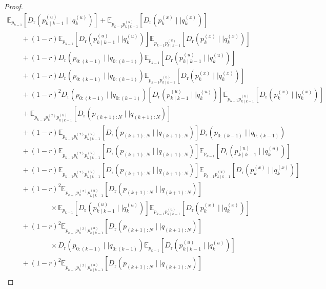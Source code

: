 \documentclass[10pt,a4paper]{amsart}
\newcommand{\Dr}[2]{{D}_{\text{r}}\left(#1\mid \mid #2 \right)}
\newcommand{\E}{\mathbb{E}}
\newcommand{\shortplant}[1]{p_{{#1}}^{(x)}}
\newcommand{\shortpolicy}[2]{p_{{#1}\mid{#2}}^{(u)}}
\begin{document}
\begin{proof}
\begin{equation}\label{eq:generalexpandk}
\begin{array}{l}
\E_{p_{k-1}}\left[\Dr{\shortpolicy{k}{k-1}}{q^{(u)}_k}\right] + \E_{p_{k-1}\shortpolicy{k}{k-1}}\left[\Dr{\shortplant{k}}{q^{(x)}_k}\right] \\ 
\qquad 
 + (1-r) \E_{p_{k-1}}\left[\Dr{\shortpolicy{k}{k-1}}{q^{(u)}_k}\right]\E_{p_{k-1}\shortpolicy{k}{k-1}}\left[\Dr{\shortplant{k}}{q^{(x)}_k}\right]
\\ 
\qquad
+ (1-r) \Dr{p_{0:(k-1)}}{q_{0:(k-1)}}\E_{p_{k-1}}\left[\Dr{\shortpolicy{k}{k-1}}{q^{(u)}_k}\right]
\\ 
\qquad
+ (1-r) \Dr{p_{0:(k-1)}}{q_{0:(k-1)}}\E_{p_{k-1}\shortpolicy{k}{k-1}}\left[\Dr{\shortplant{k}}{q^{(x)}_k}\right]
\\ 
\qquad
+ (1-r)^2 \Dr{p_{0:(k-1)}}{q_{0:(k-1)}}\left[\Dr{\shortpolicy{k}{k-1}}{q^{(u)}_k}\right]\E_{p_{k-1}\shortpolicy{k}{k-1}}\left[\Dr{\shortplant{k}}{q^{(x)}_k}\right]
\\ \qquad + \E_{p_{k-1}\shortplant{k}\shortpolicy{k}{k-1}}\left[\Dr{p_{(k+1):N}}{q_{(k+1):N}}\right] \\ 
\qquad + (1-r)  \E_{p_{k-1}\shortplant{k}\shortpolicy{k}{k-1}}\left[\Dr{p_{(k+1):N}}{q_{(k+1):N}}\right]  \Dr{p_{0:(k-1)}}{q_{0:(k-1)}}\\ 
\qquad + (1-r)  \E_{p_{k-1}\shortplant{k}\shortpolicy{k}{k-1}}\left[\Dr{p_{(k+1):N}}{q_{(k+1):N}}\right]
\E_{p_{k-1}}\left[\Dr{\shortpolicy{k}{k-1}}{q^{(u)}_k}\right]\\ 
\qquad + (1-r)  \E_{p_{k-1}\shortplant{k}\shortpolicy{k}{k-1}}\left[\Dr{p_{(k+1):N}}{q_{(k+1):N}}\right]
\E_{p_{k-1}\shortpolicy{k}{k-1}}\left[\Dr{\shortplant{k}}{q^{(x)}_k}\right] \\ 
\qquad + (1-r)^2  \E_{p_{k-1}\shortplant{k}\shortpolicy{k}{k-1}}\left[\Dr{p_{(k+1):N}}{q_{(k+1):N}}\right] \\ 
\qquad\qquad\qquad \times
\E_{p_{k-1}}\left[\Dr{\shortpolicy{k}{k-1}}{q^{(u)}_k}\right]\E_{p_{k-1}\shortpolicy{k}{k-1}}\left[\Dr{\shortplant{k}}{q^{(x)}_k}\right]
\\ \qquad + (1-r)^2  \E_{p_{k-1}\shortplant{k}\shortpolicy{k}{k-1}}\left[\Dr{p_{(k+1):N}}{q_{(k+1):N}}\right] \\ 
\qquad\qquad\qquad \times \Dr{p_{0:(k-1)}}{q_{0:(k-1)}}\E_{p_{k-1}}\left[\Dr{\shortpolicy{k}{k-1}}{q^{(u)}_k}\right]
\\ \qquad + (1-r)^2  \E_{p_{k-1}\shortplant{k}\shortpolicy{k}{k-1}}\left[\Dr{p_{(k+1):N}}{q_{(k+1):N}}\right] \\ 

\end{array}
\end{equation}
\end{proof}
\end{document}
